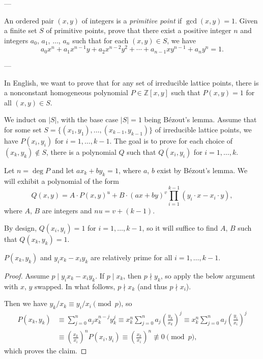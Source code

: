 
---

An ordered pair $(x,y)$ of integers is a \emph{primitive point} if $\gcd(x,y)=1$. Given a finite set $S$ of primitive points, prove that there exist a positive integer $n$ and integers $a_0$, $a_1$, $\ldots$, $a_n$ such that for each $(x,y)\in S$, we have \[a_0x^n+a_1x^{n-1}y+a_2x^{n-2}y^2+\cdots+a_{n-1}xy^{n-1}+a_ny^n=1.\]

---

In English, we want to prove that for any set of irreducible lattice points, there is a nonconstant homogeneous polynomial $P\in\mathbb Z[x,y]$ such that $P(x,y)=1$ for all $(x,y)\in S$.

We induct on $|S|$, with the base case $|S|=1$ being B\'ezout's lemma. Assume that for some set $S=\{(x_1,y_1),\ldots,(x_{k-1},y_{k-1})\}$ of irreducible lattice points, we have $P(x_i,y_i)$ for $i=1,\ldots,k-1$. The goal is to prove for each choice of $(x_k,y_k)\notin S$, there is a polynomial $Q$ such that $Q(x_i,y_i)$ for $i=1,\ldots,k$.

Let $n=\deg P$ and let $ax_k+by_k=1$, where $a$, $b$ exist by B\'ezout's lemma. We will exhibit a polynomial of the form \[Q(x,y)=A\cdot P(x,y)^u+B\cdot(ax+by)^v\prod_{i=1}^{k-1}\left(y_i\cdot x-x_i\cdot y\right),\]
where $A$, $B$ are integers and $nu=v+(k-1)$.

By design, $Q(x_i,y_i)=1$ for $i=1,\ldots,k-1$, so it will suffice to find $A$, $B$ such that $Q(x_k,y_k)=1$.
\begin{iclaim*}
    $P(x_k,y_k)$ and $y_ix_k-x_iy_k$ are relatively prime for all $i=1,\ldots,k-1$.
\end{iclaim*}
\begin{proof}
    Assume $p\mid y_ix_k-x_iy_k$. If $p\mid x_k$, then $p\nmid y_k$, so apply the below argument with $x$, $y$ swapped. In what follows, $p\nmid x_k$ (and thus $p\nmid x_i$).

    Then we have $y_k/x_k\equiv y_i/x_i\pmod p$, so
    \begin{align*}
        P(x_k,y_k)&\equiv\sum_{j=0}^na_jx_k^{n-j}y_k^j
        \equiv x_k^n\sum_{j=0}^na_j\left(\frac{y_k}{x_k}\right)^j
        \equiv x_k^n\sum_{j=0}^na_j\left(\frac{y_i}{x_i}\right)^j\\
        &\equiv\left(\frac{x_k}{x_i}\right)^nP(x_i,y_i)
        \equiv\left(\frac{x_k}{x_i}\right)^n
        \not\equiv0\pmod p,
    \end{align*}
    which proves the claim.
\end{proof}

